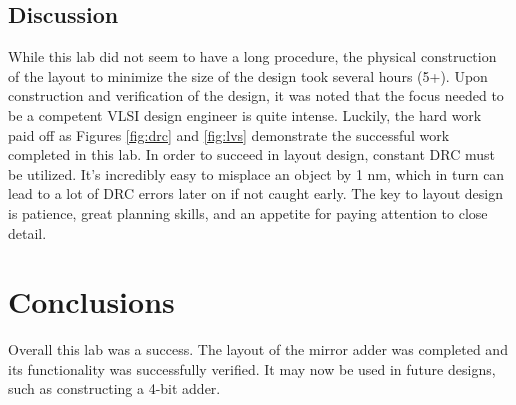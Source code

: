 \documentclass[12pt]{article}
\begin{document}
\subsection{Discussion}
While this lab did not seem to have a long procedure, the physical construction of the layout to minimize the size of the design took several hours (5+). Upon construction and verification of the design, it was noted that the focus needed to be a competent VLSI design engineer is quite intense. Luckily, the hard work paid off as Figures \ref{fig:drc} and \ref{fig:lvs} demonstrate the successful work completed in this lab. In order to succeed in layout design, constant DRC must be utilized. It's incredibly easy to misplace an object by 1 nm, which in turn can lead to a lot of DRC errors later on if not caught early. The key to layout design is patience, great planning skills, and an appetite for paying attention to close detail. 
\section{Conclusions}
Overall this lab was a success. The layout of the mirror adder was completed and its functionality was successfully verified. It may now be used in future designs, such as constructing a 4-bit adder. 
\end{document}
